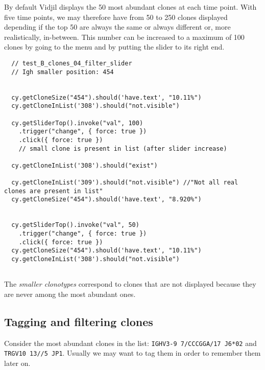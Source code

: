 By default Vidjil displays the 50 most abundant clones at each time point.
With five time points, we may therefore have from 50 to 250 clones displayed
depending if the top 50 are always the same or always different or, more
realistically, in-between.
This number can be increased to a maximum of 100 clones by going to the  menu and by putting the
slider to its right end.

\begin{verbatim}
  // test_B_clones_04_filter_slider
  // Igh smaller position: 454


  cy.getCloneSize("454").should('have.text', "10.11%")
  cy.getCloneInList('308').should("not.visible")

  cy.getSliderTop().invoke("val", 100)
    .trigger("change", { force: true })
    .click({ force: true })
    // small clone is present in list (after slider increase)

  cy.getCloneInList('308').should("exist")

  cy.getCloneInList('309').should("not.visible") //"Not all real clones are present in list"
  cy.getCloneSize("454").should('have.text', "8.920%")


  cy.getSliderTop().invoke("val", 50)
    .trigger("change", { force: true })
    .click({ force: true })
  cy.getCloneSize("454").should('have.text', "10.11%")
  cy.getCloneInList('308').should("not.visible")


\end{verbatim}

The \textit{smaller clonotypes} correspond to clones that are not displayed
because they are never among the most abundant ones.


\subsection{Tagging and filtering clones}

Consider the most abundant clones in the list:  \texttt{IGHV3-9 7/CCCGGA/17 J6*02} and  \texttt{TRGV10 13//5 JP1}.
Usually we may want to tag them in order to remember them later on.

